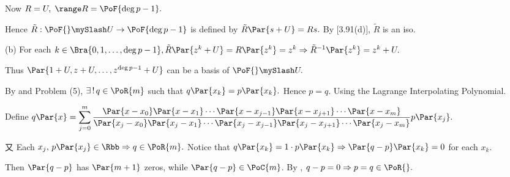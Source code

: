 Now $\null R=U,\;\range R=\PoF{\deg p-1}.$\vspace{3pt}\par\quad\Ha
Hence $\tilde{R}:\PoF{}\mySlash U\rightarrow\PoF{\deg p-1}$ is defined by $\tilde{R}\Par{s+U}=Rs.$ By [3.91(d)], $\tilde{R}$ is an iso.\par\vspace{6pt}\quad
(b) For each $k\in\Bra{0,1,\dots,\deg p-1},\tilde{R}\Par{z^k+U}=R\Par{z^k}=z^k\Rightarrow \tilde{R}{^{-1}}\Par{z^k}=z^k+U.$\par\quad\Hb
Thus $\Par{1+U,z+U,\dots,z^{\deg p-1}+U}$ can be a basis of $\PoF{}\mySlash U.$\PfEnd
\SepLine

\par\quad
By \TIPS and Problem (5), $\exists\,!\,q\in\PoR{m}$ such that $q\Par{x_k}=p\Par{x_k}.$ Hence $p=q.$\PfEnd\vspace{6pt}\quad
\Or Using the Lagrange Interpolating Polynomial.\par\vspace{6pt}\quad
Define $q\Par{x}=\displaystyle\sum\limits_{j=0}^m\frac{\Par{x-x_0}\Par{x-x_1}\cdots\Par{x-x_{j-1}}\Par{x-x_{j+1}}\cdots\Par{x-x_m}}{\Par{x_j-x_0}\Par{x_j-x_1}\cdots\Par{x_j-x_{j-1}}\Par{x_j-x_{j+1}}\cdots\Par{x_j-x_m}}p\Par{x_j}.$\par\vspace{4pt}\quad
又 Each $x_j,\,p\Par{x_j}\in\Rbb\Rightarrow q\in\PoR{m}.$ Notice that $q\Par{x_k}=1\cdot p\Par{x_k}\Rightarrow \Par{q-p}\Par{x_k}=0$ for each $x_k.$\par\quad
Then $\Par{q-p}$ has $\Par{m+1}$ zeros, while $\Par{q-p}\in\PoC{m}$. By \TIPS, $q-p=0\Rightarrow p=q\in\PoR{}.$\PfEnd
\SepLine

